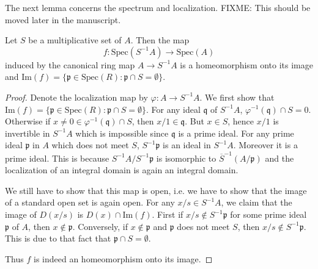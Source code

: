 \noindent
The next lemma concerns the spectrum and localization.
FIXME: This should be moved later in the manuscript.

\begin{lemma}
Let $S$ be a multiplicative set of $A$. Then the map
\[
f: \text{Spec}(S^{-1}A)\longrightarrow \text{Spec}(A)
\]
induced by the canonical ring map
$A \rightarrow S^{-1}A$ is a homeomorphism onto its image and
$\text{Im}(f)=
\{ \mathfrak p\in \text{Spec}(R): \mathfrak p\cap S=\emptyset \}$.
\end{lemma}

\begin{proof}
Denote the localization map by $\varphi:A\rightarrow S^{-1}A$. We first
show that
$\text{Im}(f)=\{ \mathfrak p\in \text{Spec}(R):
\mathfrak p\cap S=\emptyset \}$. For any
ideal
$\mathfrak q$ of $S^{-1}A$, $\varphi^{-1}(\mathfrak q)\cap S={0}$.
Otherwise if $x\not=0\in\varphi^{-1}(\mathfrak q)\cap S$, then
$x/1\in \mathfrak q$. But $x\in S$, hence $x/1$ is invertible in
$S^{-1}A$ which is impossible since $\mathfrak q$ is a prime ideal.
For any prime ideal $\mathfrak p$ in
$A$ which does not meet $S$, $S^{-1}\mathfrak p$ is an ideal in $S^{-1}A$.
Moreover it is a prime ideal. This is because $S^{-1}A/S^{-1}\mathfrak p$ is
isomorphic to $\overline{S}^{-1}(A/\mathfrak p)$ and the localization of an
integral domain is again an integral domain.

\medskip\noindent
We still have to show that this map is open, i.e. we have to show
that the image of a standard open set is again open. For any
$x/s\in S^{-1}A$, we claim that the image of $D(x/s)$ is
$D(x)\cap\text{Im}(f)$.
First if $x/s\not\in S^{-1}\mathfrak p$ for some prime
ideal $\mathfrak p$ of $A$, then $x\not\in\mathfrak p$.
Conversely, if $x\not\in\mathfrak p$
and $\mathfrak p$ does not meet $S$, then
$x/s\not\in S^{-1}\mathfrak p$. This is
due to that fact that $\mathfrak p\cap S=\emptyset$.

\medskip\noindent
Thus $f$ is indeed an homeomorphism onto its image.
\end{proof}


























